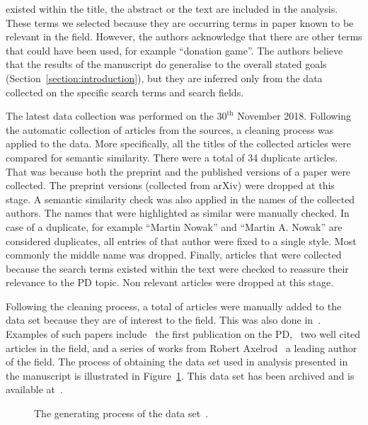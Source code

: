 \documentclass{article}
\theoremstyle{definition}
\newcommand{\manual}{}
\begin{document}
existed within the title, the abstract or the text are included in the analysis.
These terms we selected because they are occurring terms in paper known to be
relevant in the field. However, the authors acknowledge that there are other
terms that could have been used, for example ``donation game''. The authors believe
that the results of the manuscript do generalise to the overall stated goals
(Section~\ref{section:introduction}), but they are inferred only from
the data collected on the specific search terms and search fields.

The latest data collection was performed on the \(30^{\text{th}}\) November
2018. Following the automatic collection of articles from the sources, a
cleaning process was applied to the data. More specifically, all the titles of
the collected articles were compared for semantic similarity. There were a total
of 34 duplicate articles. That was because both the preprint and the published
versions of a paper were collected. The preprint versions
(collected from arXiv) were dropped at this stage. A semantic similarity check
was also applied in the names of the collected authors. The names that were
highlighted as similar were manually checked. In case of a duplicate, for
example ``Martin Nowak'' and ``Martin A. Nowak'' are considered duplicates, all
entries of that author were fixed to a single style. Most commonly the middle
name was dropped. Finally, articles that were collected because the search terms
existed within the text were checked to reassure their relevance to the PD
topic. Non relevant articles were dropped at this stage. 

Following the cleaning process, a total of \manual articles were manually added
to the data set because they are of interest to the field. This was also done
in~\cite{Liu2015}. Examples of such papers include~\cite{Flood1958} the first publication on the
PD,~\cite{Ohtsuki2006, Stewart2012} two well cited articles in the field, and a
series of works from Robert Axelrod~\cite{Axelrod1980, Axelrod1980more,
Axelrod1987, Axelrod1981, Riolo2001} a leading author of the field.
The process of obtaining the data set used in analysis presented in the
manuscript is illustrated in Figure~\ref{figure:colection_process}.
This data set has been archived and is available at~\cite{pd_data_2018}.

\begin{figure}[!hbtp]
    \begin{center}
        
    \end{center}
    \caption{The generating process of the data set~\cite{pd_data_2018}.}\label{figure:colection_process}
\end{figure}
\end{document}
